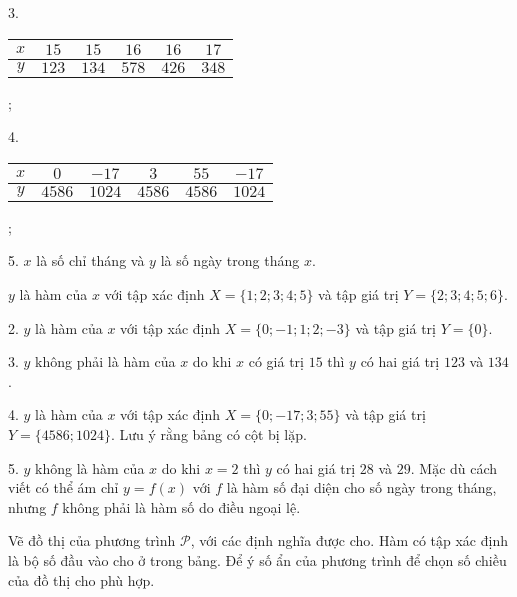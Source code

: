3.
\begin{tabular}{|c|c|c|c|c|c|}
   \hline
   $x$ & $15$ & $15$ & $16$ & $16$ & $17$ \\
   \hline
   $y$ & $123$ & $134$ & $578$ & $426$ & $348$ \\
   \hline
\end{tabular};

4.
\begin{tabular}{|c|c|c|c|c|c|}
   \hline
   $x$ & $0$ & $-17$ & $3$ & $55$ & $-17$ \\
   \hline
   $y$ & $4586$ & $1024$ & $4586$ & $4586$ & $1024$ \\
   \hline
\end{tabular};

5. $x$ là số chỉ tháng và $y$ là số ngày trong tháng $x$.

\solution

 $y$ là hàm của $x$ với tập xác định $X = \{1; 2; 3; 4; 5\}$ và tập giá trị $Y = \{2; 3; 4; 5; 6\}$.

2. $y$ là hàm của $x$ với tập xác định $X = \{0; -1; 1; 2; -3\}$ và tập giá trị $Y = \{0\}$.

3. $y$ không phải là hàm của $x$ do khi $x$ có giá trị $15$ thì $y$ có hai giá trị $123$ và $134$.

4. $y$ là hàm của $x$ với tập xác định $X = \{0; -17; 3; 55\}$ và tập giá trị $Y = \{4586; 1024\}$. Lưu ý rằng bảng có cột bị lặp.

5. $y$ không là hàm của $x$ do khi $x = 2$ thì $y$ có hai giá trị $28$ và $29$. Mặc dù cách viết có thể ám chỉ $y=f(x)$ với $f$ là hàm số đại diện cho số ngày trong tháng, nhưng $f$ không phải là hàm số do điều ngoại lệ.

 Vẽ đồ thị của phương trình $\mathcal{P}$, với các định nghĩa được cho. Hàm có tập xác định là bộ số đầu vào cho ở trong bảng. Để ý số ẩn của phương trình để chọn số chiều của đồ thị cho phù hợp.

